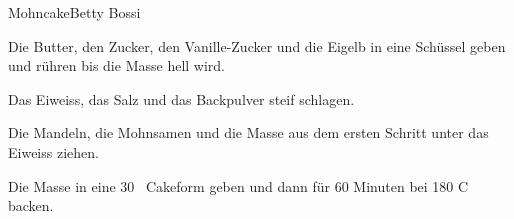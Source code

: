 
\begin{recipe}[]{Mohncake}{Betty Bossi}{}



\step%
Die Butter, den Zucker, den Vanille-Zucker und die Eigelb in eine Sch\"ussel
geben und r\"uhren bis die Masse hell wird.

\step%
Das Eiweiss, das Salz und das Backpulver steif schlagen.

\step%
Die Mandeln, die Mohnsamen und die Masse aus dem ersten Schritt unter das
Eiweiss ziehen.

\step%
Die Masse in eine 30 \cm~Cakeform geben und dann f\"ur 60 Minuten bei 180 C
backen.

\end{recipe}
